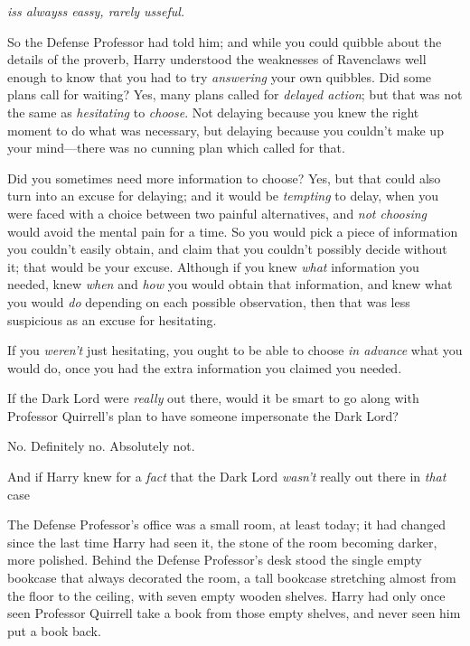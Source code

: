 
\emph{iss alwayss eassy, rarely usseful.}

\quad
So the Defense Professor had told him; and while you could quibble about the
details of the proverb, Harry understood the weaknesses of Ravenclaws well
enough to know that you had to try \emph{answering} your own quibbles. Did some
plans call for waiting? Yes, many plans called for \emph{delayed action}; but
that was not the same as \emph{hesitating} to \emph{choose}. Not delaying
because you knew the right moment to do what was necessary, but delaying
because you couldn't make up your mind—there was no cunning plan which called
for that.

Did you sometimes need more information to choose? Yes, but that could also
turn into an excuse for delaying; and it would be \emph{tempting} to delay,
when you were faced with a choice between two painful alternatives, and
\emph{not choosing} would avoid the mental pain for a time. So you would pick a
piece of information you couldn't easily obtain, and claim that you couldn't
possibly decide without it; that would be your excuse. Although if you knew
\emph{what} information you needed, knew \emph{when} and \emph{how} you would
obtain that information, and knew what you would \emph{do} depending on each
possible observation, then that was less suspicious as an excuse for hesitating.

If you \emph{weren't} just hesitating, you ought to be able to choose \emph{in
advance} what you would do, once you had the extra information you claimed you
needed.

If the Dark Lord were \emph{really} out there, would it be smart to go along
with Professor Quirrell's plan to have someone impersonate the Dark Lord?

No. Definitely no. Absolutely not.

And if Harry knew for a \emph{fact} that the Dark Lord \emph{wasn't} really out
there{\el} in \emph{that} case{\el}

The Defense Professor's office was a small room, at least today; it had changed
since the last time Harry had seen it, the stone of the room becoming darker,
more polished. Behind the Defense Professor's desk stood the single empty
bookcase that always decorated the room, a tall bookcase stretching almost from
the floor to the ceiling, with seven empty wooden shelves. Harry had only once
seen Professor Quirrell take a book from those empty shelves, and never seen
him put a book back.

